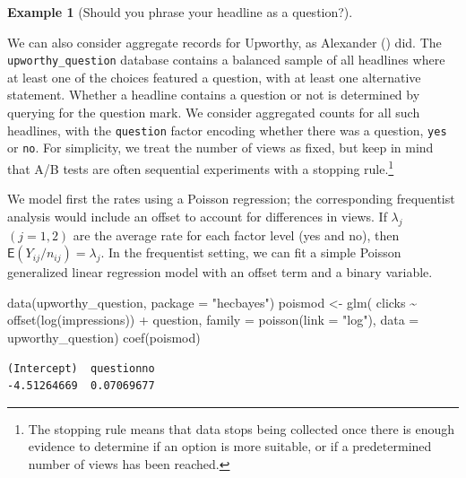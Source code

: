 \documentclass[
  11pt,
  letterpaper,
]{scrbook}
\newenvironment{Shaded}{\begin{snugshade}}{\end{snugshade}}
\newcommand{\AttributeTok}[1]{\textcolor[rgb]{0.40,0.45,0.13}{#1}}
\newcommand{\FunctionTok}[1]{\textcolor[rgb]{0.28,0.35,0.67}{#1}}
\newcommand{\NormalTok}[1]{\textcolor[rgb]{0.00,0.23,0.31}{#1}}
\newcommand{\OtherTok}[1]{\textcolor[rgb]{0.00,0.23,0.31}{#1}}
\newcommand{\SpecialCharTok}[1]{\textcolor[rgb]{0.37,0.37,0.37}{#1}}
\newcommand{\StringTok}[1]{\textcolor[rgb]{0.13,0.47,0.30}{#1}}
\theoremstyle{definition}
\theoremstyle{plain}
\theoremstyle{plain}
\theoremstyle{definition}
\newtheorem{example}{Example}[chapter]
\theoremstyle{definition}
\theoremstyle{remark}
\begin{document}
\begin{example}[Should you phrase your headline as a
question?]\protect\hypertarget{exm-poisson-upworthy-question}{}\label{exm-poisson-upworthy-question}

We can also consider aggregate records for Upworthy, as Alexander
() did. The
\texttt{upworthy\_question} database contains a balanced sample of all
headlines where at least one of the choices featured a question, with at
least one alternative statement. Whether a headline contains a question
or not is determined by querying for the question mark. We consider
aggregated counts for all such headlines, with the \texttt{question}
factor encoding whether there was a question, \texttt{yes} or
\texttt{no}. For simplicity, we treat the number of views as fixed, but
keep in mind that A/B tests are often sequential experiments with a
stopping rule.\footnote{The stopping rule means that data stops being
  collected once there is enough evidence to determine if an option is
  more suitable, or if a predetermined number of views has been reached.}

We model first the rates using a Poisson regression; the corresponding
frequentist analysis would include an offset to account for differences
in views. If \(\lambda_{j}\) \((j=1, 2)\) are the average rate for each
factor level (yes and no), then
\(\mathsf{E}(Y_{ij}/n_{ij}) = \lambda_j\). In the frequentist setting,
we can fit a simple Poisson generalized linear regression model with an
offset term and a binary variable.

\begin{Shaded}
\begin{Highlighting}[]
\FunctionTok{data}\NormalTok{(upworthy\_question, }\AttributeTok{package =} \StringTok{"hecbayes"}\NormalTok{)}
\NormalTok{poismod }\OtherTok{\textless{}{-}} \FunctionTok{glm}\NormalTok{(}
\NormalTok{  clicks }\SpecialCharTok{\textasciitilde{}} \FunctionTok{offset}\NormalTok{(}\FunctionTok{log}\NormalTok{(impressions)) }\SpecialCharTok{+}\NormalTok{ question, }
  \AttributeTok{family =} \FunctionTok{poisson}\NormalTok{(}\AttributeTok{link =} \StringTok{"log"}\NormalTok{),}
  \AttributeTok{data =}\NormalTok{ upworthy\_question)}
\FunctionTok{coef}\NormalTok{(poismod)}
\end{Highlighting}
\end{Shaded}

\begin{verbatim}
(Intercept)  questionno 
-4.51264669  0.07069677 
\end{verbatim}


\end{example}
\end{document}
